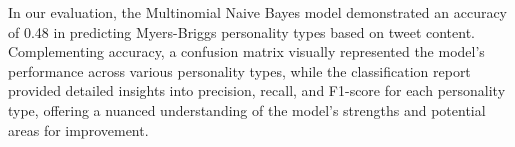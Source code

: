 \documentclass[twoside,11pt]{article}
\begin{document}
In our evaluation, the Multinomial Naive Bayes model demonstrated an accuracy of 0.48 in predicting Myers-Briggs personality types based on tweet content. Complementing accuracy, a confusion matrix visually represented the model's performance across various personality types, while the classification report provided detailed insights into precision, recall, and F1-score for each personality type, offering a nuanced understanding of the model's strengths and potential areas for improvement.

\vskip 0.2in
\end{document}
